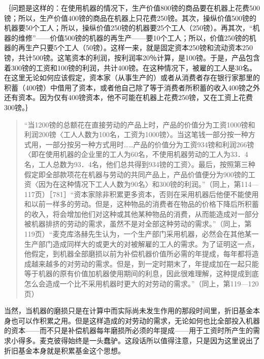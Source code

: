 ｛问题是这样的：在使用机器的情况下，生产价值800镑的商品要在机器上花费500镑；所以，生产价值400镑的商品在机器上只花费250镑。其次，操纵价值500镑的机器要50个工人；所以，操纵价值250镑的机器要25个工人（250镑）。再其次，“机器的维修”——价值500镑的机器的再生产——要10个工人；所以，价值250镑的机器的再生产只要5个工人（50镑）。这样一来，就是固定资本250镑和流动资本250镑，共计500镑。这笔资本的利润，按利润率20％计算，是100镑。于是，产品包含着300镑的工资和100镑的利润，共计400镑。在这种情况下，被雇的工人是30名。在这里无论如何应该假定，资本家（从事生产的）或者从消费者存在银行家那里的积蓄（400镑）中借用了资本，或者他自己除了等于消费者所积蓄的收入400镑之外还有资本。因为仅有400镑资本，他不可能在机器上花费250镑，又在工资上花费300镑。｝

\begin{quote}{“当1200镑的总额花在直接劳动的产品上时，产品的价值分为工资1000镑和利润200镑〈工人人数为100名，工资为1000镑〉。当这笔钱一部分按一种方式用，一部分按另一种方式用时……产品的价值分为工资934镑和利润266镑〈即在使用机器的企业里的工人为60名，不使用机器劳动的工人为33．4名，工人总数为93．4名，他们总共得到934镑的工资〉。最后，按照第三种假定即全部款项花在机器与劳动的共同产品上，产品价值便分为900镑的工资〈因为在这种情况下工人人数为90名〉和300镑的利润。”（同上，第114—117页）［781］“资本家除非积累更多资本，否则在采用机器后他便不能使用和以前一样多的劳动。但是，这种物品的消费者在物品的价格下降后所积蓄的收入，将会增加他们对这种或其他某种物品的消费，从而能造成对一部分被机器排挤的劳动的需求，虽然不是对全部这种劳动的需求。”（同上，第119页）“麦克库洛赫先生认为，一个生产部门采用机器，必然会在其他某一生产部门造成同样大的或更大的对被解雇的工人的需求。为了证明这一点，他假定，到机器全部磨损以前为补偿机器价值所必需的年提成，每年都将造成越来越多的对劳动的需求。但是，到一定时期末了，年提成加在一起只能等于机器的原有价值加机器使用期间的利息，因此很难理解，这种提成到底怎么会造成一个比不采用机器时更大的对劳动的需求。”（同上，第119—120页）}\end{quote}

当然，当机器的磨损只是在计算中而实际尚未发生作用的那段时间里，折旧基金本身也可以作积累之用。但是这样造成的对劳动的需求，无论如何也比全部投入机器的资本——而不只是补偿机器每年磨损所必须的年提成——用于工资时所产生的需求小得多。麦克彼得始终是一头蠢驴。这段话所以值得注意，只是因为这里说出了折旧基金本身就是积累基金这个思想。


